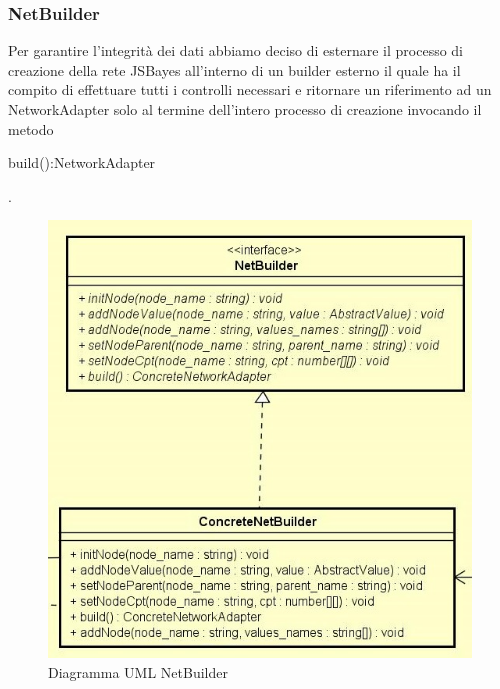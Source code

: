 \subsubsection{NetBuilder}
Per garantire l'integrità dei dati abbiamo deciso di esternare il processo di creazione della rete JSBayes all'interno di un builder esterno il quale ha il compito di effettuare tutti i controlli necessari e ritornare un riferimento ad un NetworkAdapter solo al termine dell'intero processo di creazione invocando il metodo
\begin{ttfamily}
	build():NetworkAdapter
\end{ttfamily}.
\begin{figure} [H]
	\centering
	\includegraphics[scale=0.7]{Img/NetBuilder}
	\caption{Diagramma UML NetBuilder}\label{}
\end{figure}
